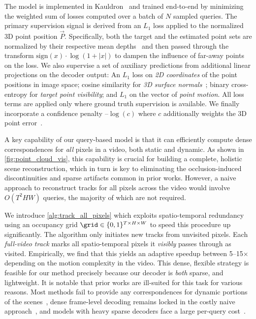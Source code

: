 The model is implemented in Kauldron~\cite{kauldron2025github} and trained end-to-end by minimizing the weighted sum of losses computed over a batch of $N$ sampled queries.
The primary supervision signal is derived from an $L_1$ loss applied to the normalized 3D point position $\vec{P}$.
Specifically, both the target and the estimated point sets are normalized by their respective mean depths~\cite{wang2024dust3r} and then passed through the transform $\text{sign}(x) \cdot \log(1 {+} |x|)$ to dampen the influence of far-away points on the loss.
We also supervise a set of auxiliary predictions from additional linear projections on the decoder output:
An $L_1$ loss on \emph{2D coordinates} of the point positions in image space;
cosine similarity for \emph{3D surface normals}~\cite{wang2025pi};
binary cross-entropy for \emph{target point visibility}; and $L_1$ on the vector of \emph{point motion}.
All loss terms are applied only where ground truth supervision is available.
We finally incorporate a confidence penalty $\text{--}\log(c)$ where $c$ additionally weights the 3D point error~\cite{kendall2017uncertainties}.

A key capability of our query-based model is that it can efficiently compute dense correspondences for \emph{all} pixels in a video, both static and dynamic.
As shown in \cref{fig:point_cloud_vis}, this capability is crucial for building a complete, holistic scene reconstruction, which in turn is key to eliminating the occlusion-induced discontinuities and sparse artifacts common in prior works.
However, a naive approach to reconstruct tracks for all pixels across the video would involve $O(T^2 H W)$ queries, the majority of which are not required.

We introduce \cref{alg:track_all_pixels} which exploits spatio-temporal redundancy using an occupancy grid $\grid \in \{0, 1\}^{T \times H \times W}$ to speed this procedure up significantly.
The algorithm only initiates new tracks from unvisited pixels.
Each \emph{full-video track} marks all spatio-temporal pixels it \emph{visibly} passes through as visited.
Empirically, we find that this yields an adaptive speedup between 5--15$\times$ depending on the motion complexity in the video.
This dense, flexible strategy is feasible for our method precisely because our decoder is \emph{both} sparse, and lightweight.
It is notable that prior works are ill-suited for this task for various reasons.
Most methods fail to provide any correspondences for dynamic portions of the scenes~\cite{wang2025vggt, wang2025pi, li2025megasam}, dense frame-level decoding remains locked in the costly naive approach~\cite{feng2025st4rtrack}, and models with heavy sparse decoders face a large per-query cost~\cite{karaev2025cotracker3, xiao2025spatialtrackerv2}.
